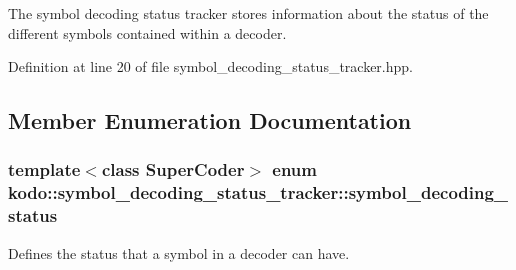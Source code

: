 The symbol decoding status tracker stores information about the status of the different symbols contained within a decoder. 

Definition at line 20 of file symbol\-\_\-decoding\-\_\-status\-\_\-tracker.\-hpp.



\subsection{Member Enumeration Documentation}
\hypertarget{classkodo_1_1symbol__decoding__status__tracker_a10357bdecff284a06070541d41a58b12}{
\subsubsection[{symbol\-\_\-decoding\-\_\-status}]{\setlength{\rightskip}{0pt plus 5cm}template$<$class Super\-Coder$>$ enum {\bf kodo\-::symbol\-\_\-decoding\-\_\-status\-\_\-tracker\-::symbol\-\_\-decoding\-\_\-status}}}\label{classkodo_1_1symbol__decoding__status__tracker_a10357bdecff284a06070541d41a58b12}


Defines the status that a symbol in a decoder can have. 

